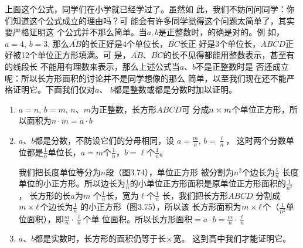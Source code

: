 上面这个公式，同学们在小学就已经学过了。虽然如
此，我们不妨问问同学：你们知道这个公式成立的理由吗？可
能会有许多同学觉得这个问题太简单了，其实要严格证明这
个公式并不那么简单。当$a,b$是正整数时，的确是对的。例
如，$a=4$, $b=3$, 那么$\overline{AB}$的长正好是4个单位长，$\overline{BC}$长正
好是3个单位长，$ABCD$正好被12个单位正方形填满。可
是，$\overline{AB}$、$\overline{BC}$的长不见得都能用整数表示，甚至有的线段长
不能用有理数来表示，那么上述公式当$a$、$b$不是正整数时是
否还成立呢：所以长方形面积的讨论并不是同学想像的那么
简单，以至我们现在还不能严格证明它。下面我们仅对$a$、
$b$都是整数或都是分数时加以证明。

\begin{enumerate}
    \item  $a=n$, $b=m$, $n$、$m$为正整数，长方形$ABCD$可
    分成$n\times m$个单位正方形，所以面积为$n\cdot m=a\cdot b$
    \item  $a$、$b$都是分数，不防设它们的分母相同，设
$a=\frac{m}{n}$, $b=\frac{\ell}{n}$，
    这时两个分数单位都是$\frac{1}{n}$单位长，$a=m$个$\frac{1}{n}$，$b=\ell$个$\frac{1}{n}$。

    我们把长度单位等分为$n$段（图3.74），单位正方形
    被分割为$n^2$个边长为$\frac{1}{n}$
    长度单位的小正方形。所以边长为$\frac{1}{n}$的小单位正方形面积是原单位正方形面积的$\frac{1}{n^2}$，
    长方形的长$a$为$m$
    个$\frac{1}{n}$长，宽为$\ell$个$\frac{1}{n}$
    长，我们把长方形$ABCD$
    分割成$m\times \ell$个边长为$\frac{1}{n}$
    的小正方形（图3.75），所以该
    长方形面积为$m\times\ell$个（$\frac{1}{n^2}$单位面积），即$\frac{m}{n}\cdot\frac{\ell}{n}$个单
    位面积。所以长方形面积$=a\cdot b=\frac{m}{n}\cdot\frac{\ell}{n}$
 \item $a$、$b$都是实数时，长方形的面积仍等于长$\times$宽。
    这到高中我们才能证明它。
\end{enumerate}




\begin{figure}[htp]\centering
    \begin{minipage}[t]{0.4\textwidth}
    \centering
{}
    \caption{}
    \end{minipage}
    \begin{minipage}[t]{0.55\textwidth}
    \centering
    \caption{}
    \end{minipage}
    \end{figure}


